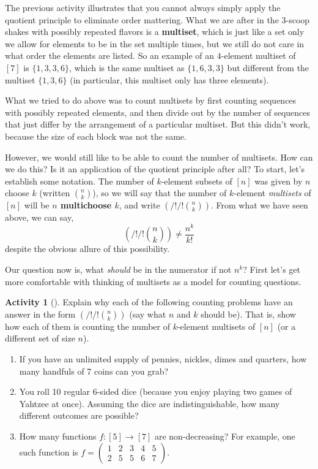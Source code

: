 \documentclass[10pt,]{book}
\newcommand{\terminology}[1]{\textbf{#1}}
\theoremstyle{plain}
\theoremstyle{definition}
\theoremstyle{definition}
\theoremstyle{definition}
\newtheorem{activity}[project]{Activity}
\theoremstyle{definition}
\numberwithin{equation}{chapter}
\newcommand{\mchoose}[2]{\left(/!/!\binom{#1}{#2}\!\!\right)}
\newcommand{\twoline}[2]{\begin{pmatrix}#1 \\ #2 \end{pmatrix}}
\newcommand{\amp}{&}
\begin{document}
\hypertarget{p-712}{}%
The previous activity illustrates that you cannot always simply apply the quotient principle to eliminate order mattering.  What we are after in the 3-scoop shakes with possibly repeated flavors is a \terminology{multiset}, which is just like a set only we allow for elements to be in the set multiple times, but we still do not care in what order the elements are listed.  So an example of an \(4\)-element multiset of \([7]\) is \(\{1,3,3,6\}\), which is the same multiset as \(\{1,6,3,3\}\) but different from the multiset \(\{1,3,6\}\) (in particular, this multiset only has three elements).%
\par
\hypertarget{p-713}{}%
What we tried to do above was to count multisets by first counting sequences with possibly repeated elements, and then divide out by the number of sequences that just differ by the arrangement of a particular multiset.  But this didn't work, because the size of each block was not the same.%
\par
\hypertarget{p-714}{}%
However, we would still like to be able to count the number of multisets.  How can we do this?  Is it an application of the quotient principle after all?  To start, let's establish some notation.  The number of \(k\)-element subsets of \([n]\) was given by \(n\) choose \(k\) (written \(\binom{n}{k}\)), so we will say that the number of \(k\)-element \emph{multisets} of \([n]\) will be \terminology{\(n\) multichoose \(k\)}, and write \(\mchoose{n}{k}\).  From what we have seen above, we can say,%
\begin{equation*}
\mchoose{n}{k} \ne \frac{n^k}{k!}
\end{equation*}
despite the obvious allure of this possibility.%
\par
\hypertarget{p-715}{}%
Our question now is, what \emph{should} be in the numerator if not \(n^k\)?  First let's get more comfortable with thinking of multisets as a model for counting questions.%
\begin{activity}[]\label{activity-63}
\hypertarget{p-716}{}%
Explain why each of the following counting problems have an answer in the form \(\mchoose{n}{k}\) (say what \(n\) and \(k\) should be).  That is, show how each of them is counting the number of \(k\)-element multisets of \([n]\) (or a different set of size \(n\)).%
\begin{enumerate}[font=\bfseries,label=(\alph*),ref=\alph*]
\item\label{task-84} \hypertarget{p-717}{}%
If you have an unlimited supply of pennies, nickles, dimes and quarters, how many handfuls of 7 coins can you grab?%
\item\label{task-85} \hypertarget{p-718}{}%
You roll 10 regular 6-sided dice (because you enjoy playing two games of Yahtzee at once).  Assuming the dice are indistinguishable, how many different outcomes are possible?%
\item\label{task-86} \hypertarget{p-719}{}%
How many functions \(f:[5] \to [7]\) are non-decreasing?  For example, one such function is \(f = \twoline{1 \amp 2 \amp 3 \amp 4 \amp 5}{2 \amp 5 \amp 5 \amp 6 \amp 7}\).%
\end{enumerate}
\end{activity}
\end{document}

